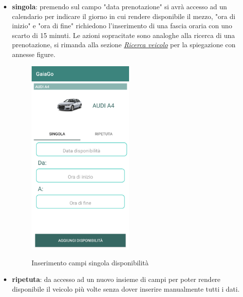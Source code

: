 \begin{itemize}
	\item \textbf{singola}: premendo sul campo "data prenotazione" si avrà accesso ad un calendario per indicare il giorno in cui rendere disponibile il mezzo, "ora di inizio" e "ora di fine" richiedono l'inserimento di una fascia oraria con uno scarto di 15 minuti.
	Le azioni sopracitate sono analoghe alla ricerca di una prenotazione, si rimanda alla sezione \textit{\hyperref[sec:hello]{Ricerca veicolo}} per la spiegazione con annesse figure.
	\begin{figure}[H] 
		\centering 
		\includegraphics[width=0.5\textwidth]{res/images/aggiungi_disponibilita2.png}\\
		\caption{Inserimento campi singola disponibilità}
		\label{campi disponibilità}
	\end{figure}
	\pagebreak
	\item \textbf{ripetuta}: da accesso ad un nuovo insieme di campi per poter rendere disponibile il veicolo più volte senza dover inserire manualmente tutti i dati. 
	\begin{figure}[H] 
		\centering 

\end{figure}
\end{itemize}
